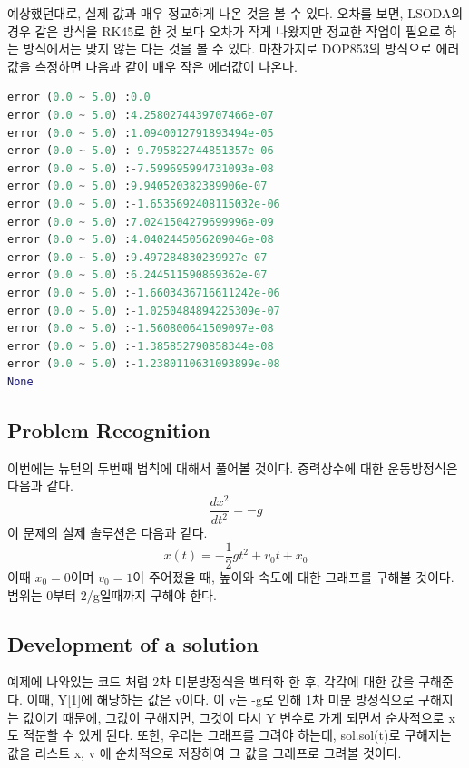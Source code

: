 \documentclass[11pt]{article}
\begin{document}
예상했던대로, 실제 값과 매우 정교하게 나온 것을 볼 수 있다. 오차를 보면, LSODA의 경우 같은 방식을 RK45로 한 것 보다 오차가 작게 나왔지만 정교한 작업이 필요로 하는 방식에서는 맞지 않는 다는 것을 볼 수 있다. 마찬가지로 DOP853의 방식으로 에러 값을 측정하면 다음과 같이 매우 작은 에러값이 나온다.
\begin{lstlisting}[language=Python]
error (0.0 ~ 5.0) :0.0
error (0.0 ~ 5.0) :4.2580274439707466e-07
error (0.0 ~ 5.0) :1.0940012791893494e-05
error (0.0 ~ 5.0) :-9.795822744851357e-06
error (0.0 ~ 5.0) :-7.599695994731093e-08
error (0.0 ~ 5.0) :9.940520382389906e-07
error (0.0 ~ 5.0) :-1.6535692408115032e-06
error (0.0 ~ 5.0) :7.0241504279699996e-09
error (0.0 ~ 5.0) :4.0402445056209046e-08
error (0.0 ~ 5.0) :9.497284830239927e-07
error (0.0 ~ 5.0) :6.244511590869362e-07
error (0.0 ~ 5.0) :-1.6603436716611242e-06
error (0.0 ~ 5.0) :-1.0250484894225309e-07
error (0.0 ~ 5.0) :-1.560800641509097e-08
error (0.0 ~ 5.0) :-1.385852790858344e-08
error (0.0 ~ 5.0) :-1.2380110631093899e-08
None
\end{lstlisting}










\subsection{Problem Recognition} 
이번에는 뉴턴의 두번째 법칙에 대해서 풀어볼 것이다. 중력상수에 대한 운동방정식은 다음과 같다.
\begin{equation}
\frac{dx^2}{dt^2} = -g
\end{equation}
이 문제의 실제 솔루션은 다음과 같다.
\begin{equation}
x(t) = -\frac{1}{2} gt^2 + v_0 t + x_0
\end{equation}
이때 $x_0 = 0$이며 $v_0 = 1$이 주어졌을 때, 높이와 속도에 대한 그래프를 구해볼 것이다. 범위는 0부터 2/g일때까지 구해야 한다.

\subsection{Development of a solution} 
예제에 나와있는 코드 처럼 2차 미분방정식을 벡터화 한 후, 각각에 대한 값을 구해준다. 이때, Y[1]에 해당하는 값은 v이다. 이 v는 -g로 인해 1차 미분 방정식으로 구해지는 값이기 때문에, 그값이 구해지면, 그것이 다시 Y 변수로 가게 되면서 순차적으로 x도 적분할 수 있게 된다. 또한, 우리는 그래프를 그려야 하는데, sol.sol(t)로 구해지는 값을 리스트 x, v 에 순차적으로 저장하여 그 값을 그래프로 그려볼 것이다. 
\end{document}
